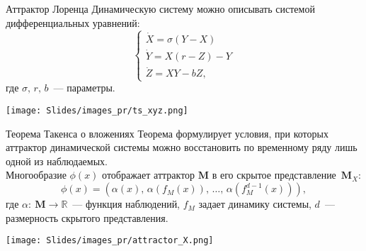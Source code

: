 \documentclass[9pt]{beamer}
\newcommand{\bM}{\mathbf{M}}
\begin{document}
\begin{frame}{Аттрактор Лоренца}
Динамическую систему можно описывать системой дифференциальных уравнений:
$$
    \begin{cases}
        \dot X = \sigma(Y -X)\\
        \dot Y = X(r - Z) - Y\\
        \dot Z = XY - bZ,
    \end{cases}
$$
где $\sigma, \, r,\, b$~--- параметры.

\vspace{0.3cm}
\texttt{[image: Slides/images\_pr/ts\_xyz.png]}

\end{frame}
\begin{frame}{Теорема Такенса о вложениях}
\vspace{0.2cm}
Теорема формулирует условия, при которых аттрактор динамической системы можно восстановить по временному ряду лишь одной из наблюдаемых.\\
Многообразие $\phi(x)$ отображает аттрактор $\bM$ в его скрытое представление~$\bM_X$:
\[ \phi(x) = (\alpha(x),\, \alpha(f_M(x)),\, \dots,\, \alpha(f_M^{d-1}(x))),\]
где $\alpha:\: \bM\rightarrow \mathbb{R}$~--- функция наблюдений, $f_M$ задает динамику системы, $d$~--- размерность скрытого представления.

\vspace{0.2cm}
\texttt{[image: Slides/images\_pr/attractor\_X.png]}

\end{frame}
\end{document}
